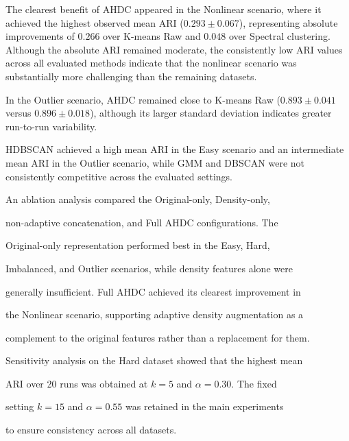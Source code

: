 \documentclass[10pt,twoside]{article}
\numberwithin{equation}{section}
\begin{document}
The clearest benefit of AHDC appeared in the Nonlinear scenario, where it achieved the highest observed mean ARI ($0.293\pm0.067$), representing absolute improvements of $0.266$ over K-means Raw and $0.048$ over Spectral clustering. Although the absolute ARI remained moderate, the consistently low ARI values across all evaluated methods indicate that the nonlinear scenario was substantially more challenging than the remaining datasets.

In the Outlier scenario, AHDC remained close to K-means Raw ($0.893\pm0.041$ versus $0.896\pm0.018$), although its larger standard deviation indicates greater run-to-run variability.

HDBSCAN achieved a high mean ARI in the Easy scenario and an intermediate mean ARI in the Outlier scenario, while GMM and DBSCAN were not consistently competitive across the evaluated settings.



An ablation analysis compared the Original-only, Density-only,

non-adaptive concatenation, and Full AHDC configurations. The

Original-only representation performed best in the Easy, Hard,

Imbalanced, and Outlier scenarios, while density features alone were

generally insufficient. Full AHDC achieved its clearest improvement in

the Nonlinear scenario, supporting adaptive density augmentation as a

complement to the original features rather than a replacement for them.



Sensitivity analysis on the Hard dataset showed that the highest mean

ARI over 20 runs was obtained at $k=5$ and $\alpha=0.30$. The fixed

setting $k=15$ and $\alpha=0.55$ was retained in the main experiments

to ensure consistency across all datasets.
\end{document}
